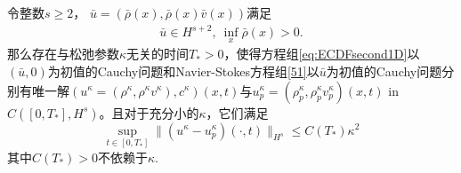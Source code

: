 
\begin{theorem}\label{theoremCE}
令整数$s \ge 2$， ${\bar u} =({\bar \rho}(x),\bar{\rho}(x){\bar v}(x))$满足
  \begin{eqnarray*}
    \bar{u}\in H^{s+2},\ \inf_{x} \bar{\rho}(x)>0.
 \end{eqnarray*}
那么存在与松弛参数$\kappa$无关的时间$T_*>0$，使得方程组\eqref{eq:ECDFsecond1D}以$(\bar{u},0)$为初值的Cauchy问题和Navier-Stokes方程组\eqref{51}以${\bar u}$为初值的Cauchy问题分别有唯一解$(u^\kappa=(\rho^\kappa,\rho^\kappa v^\kappa), c^\kappa)(x,t)$与$u^\kappa_p=(\rho^\kappa_p,\rho^\kappa_p v^\kappa_p)(x,t)$ in $C([0,T_*], H^s)$。且对于充分小的$\kappa$，它们满足
  \begin{equation}\label{52}
    \sup_{t \in [0, T_*]} \|(u^\kappa-u^\kappa_p)(\cdot,t)\|_{H^s} \le C(T_*) \kappa^2
  \end{equation}
 其中$C(T_*)>0$不依赖于$\kappa$.
\end{theorem}


